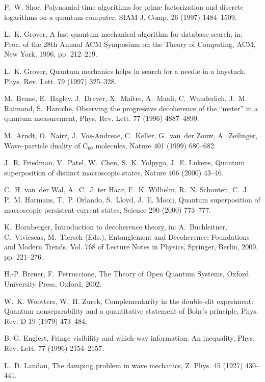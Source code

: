 \documentclass[3p,sort&compress,12pt]{elsarticle}
\begin{document}
\begin{thebibliography}{100}
P.~W. Shor, Polynomial-time algorithms for prime factorization and discrete
  logarithms on a quantum computer, SIAM J. Comp. 26 (1997) 1484--1509.

L.~K. Grover, A fast quantum mechanical algorithm for database search, in:
  Proc. of the 28th Annual ACM Symposium on the Theory of Computing, ACM, New
  York, 1996, pp. 212--219.

L.~K. Grover, Quantum mechanics helps in search for a needle in a haystack,
  Phys. Rev. Lett. 79 (1997) 325--328.

M.~Brune, E.~Hagley, J.~Dreyer, X.~Ma{\^i}tre, A.~Maali, C.~Wunderlich, J.~M.
  Raimond, S.~Haroche, Observing the progressive decoherence of the ``meter''
  in a quantum measurement, Phys. Rev. Lett. 77 (1996) 4887--4890.

M.~Arndt, O.~Nairz, J.~Vos-Andreae, C.~Keller, G.~van~der Zouw, A.~Zeilinger,
  Wave--particle duality of {C$_{60}$} molecules, Nature 401 (1999) 680--682.

J.~R. Friedman, V.~Patel, W.~Chen, S.~K. Yolpygo, J.~E. Lukens, Quantum
  superposition of distinct macroscopic states, Nature 406 (2000) 43--46.

C.~H. van~der Wal, A.~C.~J. ter Haar, F.~K. Wilhelm, R.~N. Schouten, C.~J.
  P.~M. Harmans, T.~P. Orlando, S.~Lloyd, J.~E. Mooij, Quantum superposition of
  macroscopic persistent-current states, Science 290 (2000) 773--777.

K.~Hornberger, Introduction to decoherence theory, in: A.~Buchleitner,
  C.~Viviescas, M.~Tiersch (Eds.), Entanglement and Decoherence: Foundations
  and Modern Trends, Vol. 768 of Lecture Notes in Physics, Springer, Berlin,
  2009, pp. 221--276.

H.-P. Breuer, F.~Petruccione, The Theory of Open Quantum Systems, Oxford
  University Press, Oxford, 2002.

W.~K. Wootters, W.~H. Zurek, Complementarity in the double-slit experiment:
  {Q}uantum nonseparability and a quantitative statement of {B}ohr's principle,
  Phys. Rev. D 19 (1979) 473--484.

B.-G. Englert, Fringe visibility and which-way information: An inequality,
  Phys. Rev. Lett. 77 (1996) 2154--2157.

L.~D. Landau, The damping problem in wave mechanics, Z. Phys. 45 (1927)
  430--441.


\end{thebibliography}
\end{document}
